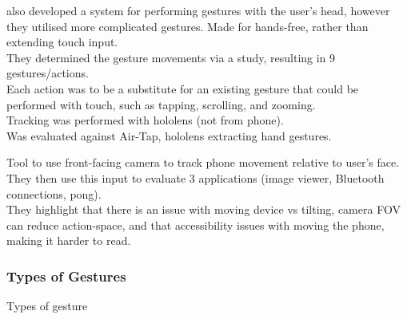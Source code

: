 \cite{yan2018headgesture} also developed a system for performing gestures with the user's head, however they utilised more complicated gestures. Made for hands-free, rather than extending touch input.\\
They determined the gesture movements via a study, resulting in 9 gestures/actions.\\
Each action was to be a substitute for an existing gesture that could be performed with touch, such as tapping, scrolling, and zooming.\\
Tracking was performed with hololens (not from phone).\\
Was evaluated against Air-Tap, hololens extracting hand gestures.

\cite{hansen2006use} Tool to use front-facing camera to track phone movement relative to user's face.
They then use this input to evaluate 3 applications (image viewer, Bluetooth connections, pong).\\
They highlight that there is an issue with moving device vs tilting, camera FOV can reduce action-space, and that accessibility issues with moving the phone, making it harder to read.

\subsubsection{Types of Gestures} %

\cite{aigner2012understanding} Types of gesture



